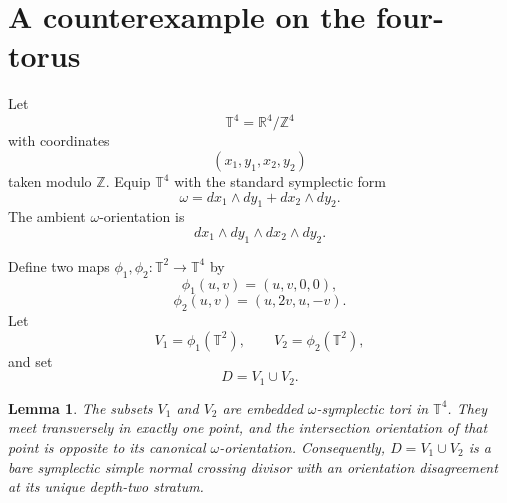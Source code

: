 \documentclass[12pt]{article}
\newtheorem{lemma}[theorem]{Lemma}
\newcommand{\R}{\mathbb R}
\newcommand{\Z}{\mathbb Z}
\newcommand{\T}{\mathbb T}
\begin{document}
\section{A counterexample on the four-torus}

Let
\[
\T^4=\R^4/\Z^4
\]
with coordinates
\[
(x_1,y_1,x_2,y_2)
\]
taken modulo \(\Z\). Equip \(\T^4\) with the standard symplectic form
\[
\omega=dx_1\wedge dy_1+dx_2\wedge dy_2.
\]
The ambient \(\omega\)-orientation is
\[
dx_1\wedge dy_1\wedge dx_2\wedge dy_2.
\]

Define two maps \(\phi_1,\phi_2:\T^2\to\T^4\) by
\[
\phi_1(u,v)=(u,v,0,0),
\]
\[
\phi_2(u,v)=(u,2v,u,-v).
\]
Let
\[
V_1=\phi_1(\T^2),\qquad V_2=\phi_2(\T^2),
\]
and set
\[
D=V_1\cup V_2.
\]

\begin{lemma}\label{lem:T4-example}
The subsets \(V_1\) and \(V_2\) are embedded \(\omega\)-symplectic tori in \(\T^4\). They meet transversely in exactly one point, and the intersection orientation of that point is opposite to its canonical \(\omega\)-orientation. Consequently, \(D=V_1\cup V_2\) is a bare symplectic simple normal crossing divisor with an orientation disagreement at its unique depth-two stratum.
\end{lemma}
\end{document}
